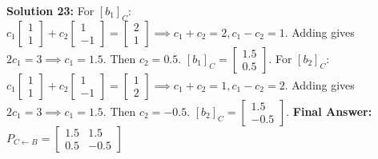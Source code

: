 \documentclass{article}
\begin{document}
\vspace{0.3cm}
\textbf{Solution 23:}
For $[b_1]_C$: $c_1 \begin{bmatrix} 1 \\ 1 \end{bmatrix} + c_2 \begin{bmatrix} 1 \\ -1 \end{bmatrix} = \begin{bmatrix} 2 \\ 1 \end{bmatrix} \implies c_1+c_2=2, c_1-c_2=1$. Adding gives $2c_1=3 \implies c_1=1.5$. Then $c_2=0.5$. $[b_1]_C = \begin{bmatrix} 1.5 \\ 0.5 \end{bmatrix}$.
For $[b_2]_C$: $c_1 \begin{bmatrix} 1 \\ 1 \end{bmatrix} + c_2 \begin{bmatrix} 1 \\ -1 \end{bmatrix} = \begin{bmatrix} 1 \\ 2 \end{bmatrix} \implies c_1+c_2=1, c_1-c_2=2$. Adding gives $2c_1=3 \implies c_1=1.5$. Then $c_2=-0.5$. $[b_2]_C = \begin{bmatrix} 1.5 \\ -0.5 \end{bmatrix}$.
\textbf{Final Answer:} $P_{C \leftarrow B} = \begin{bmatrix} 1.5 & 1.5 \\ 0.5 & -0.5 \end{bmatrix}$
\end{document}
